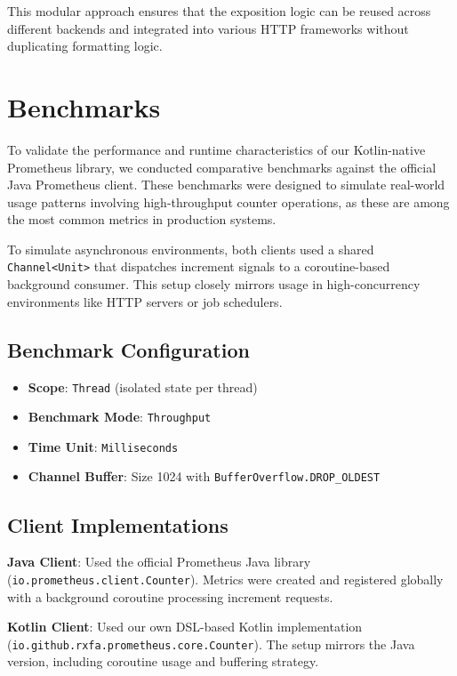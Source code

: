 This modular approach ensures that the exposition logic can be reused across different backends and integrated into various HTTP frameworks without duplicating formatting logic.


\section{Benchmarks}

To validate the performance and runtime characteristics of our Kotlin-native Prometheus library, we conducted comparative benchmarks against the official Java Prometheus client. These benchmarks were designed to simulate real-world usage patterns involving high-throughput counter operations, as these are among the most common metrics in production systems.

To simulate asynchronous environments, both clients used a shared \texttt{Channel<Unit>} that dispatches increment signals to a coroutine-based background consumer. This setup closely mirrors usage in high-concurrency environments like HTTP servers or job schedulers.

\subsection*{Benchmark Configuration}
\begin{itemize}
    \item \textbf{Scope}: \texttt{Thread} (isolated state per thread)
    \item \textbf{Benchmark Mode}: \texttt{Throughput}
    \item \textbf{Time Unit}: \texttt{Milliseconds}
    \item \textbf{Channel Buffer}: Size 1024 with \texttt{BufferOverflow.DROP\_OLDEST}
\end{itemize}

\subsection*{Client Implementations}

\textbf{Java Client}: Used the official Prometheus Java library (\texttt{io.prometheus.client.Counter}). Metrics were created and registered globally with a background coroutine processing increment requests.

\textbf{Kotlin Client}: Used our own DSL-based Kotlin implementation (\texttt{io.github.rxfa.prometheus.core.Counter}). The setup mirrors the Java version, including coroutine usage and buffering strategy.

